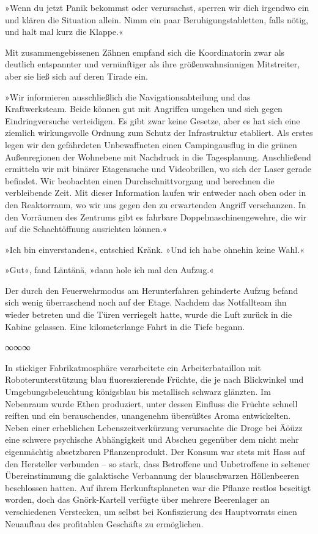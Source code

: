 »Wenn du jetzt Panik bekommst oder verursachst, sperren wir dich irgendwo ein und klären die Situation allein. Nimm ein paar Beruhigungstabletten, falls nötig, und halt mal kurz die Klappe.«

Mit zusammengebissenen Zähnen empfand sich die Koordinatorin zwar als deutlich entspannter und vernünftiger als ihre größenwahnsinnigen Mitstreiter, aber sie ließ sich auf deren Tirade ein.

»Wir informieren ausschließlich die Navigationsabteilung und das Kraftwerksteam. Beide können gut mit Angriffen umgehen und sich gegen Eindringversuche verteidigen. Es gibt zwar keine Gesetze, aber es hat sich eine ziemlich wirkungsvolle Ordnung zum Schutz der Infrastruktur etabliert. Als erstes legen wir den gefährdeten Unbewaffneten einen Campingausflug in die grünen Außenregionen der Wohnebene mit Nachdruck in die Tagesplanung. Anschließend ermitteln wir mit binärer Etagensuche und Videobrillen, wo sich der Laser gerade befindet. Wir beobachten einen Durchschnittvorgang und berechnen die verbleibende Zeit. Mit dieser Information laufen wir entweder nach oben oder in den Reaktorraum, wo wir uns gegen den zu erwartenden Angriff verschanzen. In den Vorräumen des Zentrums gibt es fahrbare Doppelmaschinengewehre, die wir auf die Schachtöffnung ausrichten können.«

»Ich bin einverstanden«, entschied Kränk. »Und ich habe ohnehin keine Wahl.«

»Gut«, fand Läntänä, »dann hole ich mal den Aufzug.«

Der durch den Feuerwehrmodus am Herunterfahren gehinderte Aufzug befand sich wenig überraschend noch auf der Etage. Nachdem das Notfallteam ihn wieder betreten und die Türen verriegelt hatte, wurde die Luft zurück in die Kabine gelassen. Eine kilometerlange Fahrt in die Tiefe begann.

\begin{center}
	∞∞∞
\end{center}

In stickiger Fabrikatmosphäre verarbeitete ein Arbeiterbataillon mit Roboterunterstützung blau fluoreszierende Früchte, die je nach Blickwinkel und Umgebungsbeleuchtung königsblau bis metallisch schwarz glänzten. Im Nebenraum wurde Ethen produziert, unter dessen Einfluss die Früchte schnell reiften und ein berauschendes, unangenehm übersüßtes Aroma entwickelten. Neben einer erheblichen Lebenszeitverkürzung verursachte die Droge bei Äöüzz eine schwere psychische Abhängigkeit und Abscheu gegenüber dem nicht mehr eigenmächtig absetzbaren Pflanzenprodukt. Der Konsum war stets mit Hass auf den Hersteller verbunden – so stark, dass Betroffene und Unbetroffene in seltener Übereinstimmung die galaktische Verbannung der blauschwarzen Höllenbeeren beschlossen hatten. Auf ihrem Herkunftsplaneten war die Pflanze restlos beseitigt worden, doch das Gnörk-Kartell verfügte über mehrere Beerenlager an verschiedenen Verstecken, um selbst bei Konfiszierung des Hauptvorrats einen Neuaufbau des profitablen Geschäfts zu ermöglichen.

